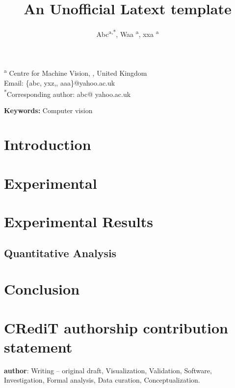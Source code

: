 \documentclass[12pt]{article}
\begin{document}
\title{An Unofficial Latext template}
\author{
    Abc\textsuperscript{a,*},
    Waa \textsuperscript{a},
    xxa \textsuperscript{a}
}
\date{}

\maketitle

\noindent\textsuperscript{a} Centre for Machine Vision, , United Kingdom \\
Email: \{abc, yxz,, aaa\}@yahoo.ac.uk \\
\textsuperscript{*}Corresponding author: abc@ yahoo.ac.uk

\begin{abstract}


\end{abstract}

\textbf{Keywords:} Computer vision

\doublespacing

\section{Introduction}



\section{Experimental}

\section{Experimental Results}

\subsection{Quantitative Analysis}

\section{Conclusion}


\section*{CRediT authorship contribution statement}
\textbf{author}: Writing – original draft, Visualization, Validation, Software, Investigation, Formal analysis, Data curation, Conceptualization. 
\end{document}
